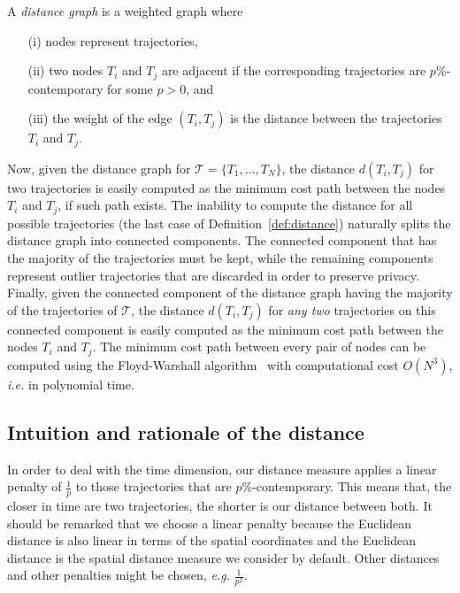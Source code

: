 \begin{definition} \label{def:distancegraph}
A \emph{distance graph} is a weighted graph where
\begin{enumerate}
\setlength{\itemsep}{-1mm}
\item[(i)] nodes represent trajectories,
\item[(ii)] two nodes $T_i$ and $T_j$ are adjacent if the corresponding
trajectories are $p$\%-contemporary for some
$p>0$, and
\item[(iii)] the weight of the edge $(T_i, T_j)$ is the distance between
the trajectories $T_i$ and $T_j$.
\end{enumerate}
\end{definition}

Now, given the distance graph for $\mathcal{T} = \{ T_1, \ldots, T_N \}$,
the distance $d(T_i, T_j)$ for two trajectories is easily computed as the
minimum cost path between the nodes $T_i$ and $T_j$, if such path exists.
The inability to compute the distance for all possible trajectories (the
last case of Definition~\ref{def:distance}) naturally splits the distance
graph into connected components. The connected component that has the majority
of the trajectories must be kept, while the remaining components represent
outlier trajectories that are discarded in order to preserve privacy. Finally,
given the connected component of the distance graph having the majority of
the trajectories of $\mathcal{T}$, the distance $d(T_i, T_j)$ for \emph{any
two} trajectories on this connected component is easily computed as the
minimum cost path between the nodes $T_i$ and $T_j$.
The minimum cost path between every pair of nodes can
be computed using the Floyd-Warshall algorithm~\cite{Floyd} with computational cost
$O(N^3)$, {\em i.e.} in polynomial time.

\subsection{Intuition and rationale of the distance}

In order to deal with the time dimension, our distance measure applies
a linear penalty of $\frac{1}{p}$ to those trajectories that
are $p\%$-contemporary. This means that, the closer in time are
two trajectories, the shorter is our distance between both.
It should be remarked that we choose a linear penalty because
the Euclidean distance is also linear in terms of the spatial coordinates
and the Euclidean distance is the spatial distance measure we
consider by default. Other distances
and other penalties might be chosen, {\em e.g.} $\frac{1}{p^2}$.

